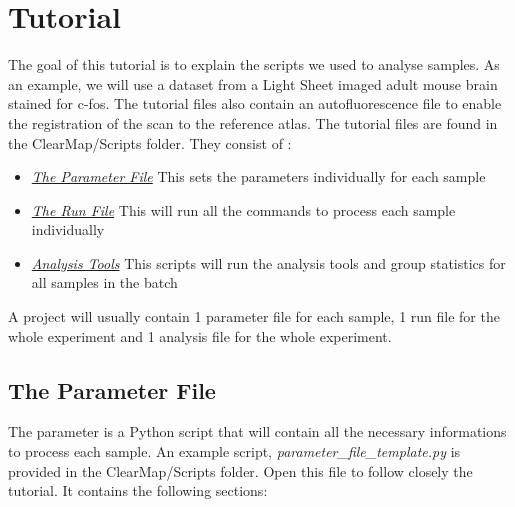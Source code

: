 \documentclass[letterpaper,10pt,english]{sphinxmanual}
\begin{document}
\section{Tutorial}
\label{tutorial::doc}\label{tutorial:tutorial}
The goal of this tutorial is to explain the scripts we used to analyse samples. As an example, we will use a dataset from a Light Sheet imaged adult mouse brain stained for c-fos. The tutorial files also contain an autofluorescence file to enable the registration of the scan to the reference atlas. The tutorial files are found in the ClearMap/Scripts folder. They consist of :
\begin{itemize}
\item {} 
{\hyperref[tutorial:the-parameter-file]{\emph{The Parameter File}}} This sets the parameters individually for each sample

\item {} 
{\hyperref[tutorial:the-run-file]{\emph{The Run File}}} This will run all the commands to process each sample individually

\item {} 
{\hyperref[tutorial:analysis-tools]{\emph{Analysis Tools}}} This scripts will run the analysis tools and group statistics for all samples in the batch

\end{itemize}

A project will usually contain 1 parameter file for each sample, 1 run file for the whole experiment and 1 analysis file for the whole experiment.


\subsection{The Parameter File}
\label{tutorial:the-parameter-file}
The parameter is a Python script that will contain all the necessary informations to process each sample. An example script, \emph{parameter\_file\_template.py} is provided in the ClearMap/Scripts folder. Open this file to follow closely the tutorial. It contains the following sections:
\end{document}
